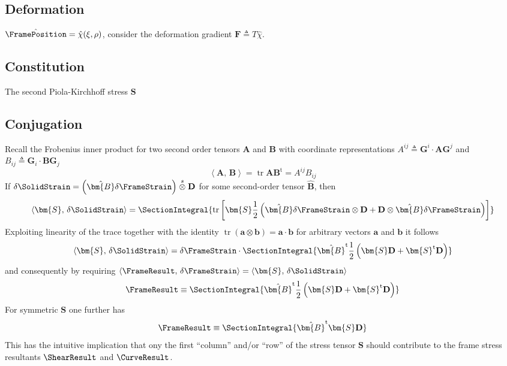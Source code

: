 \subsection{Deformation}

\(\hat{\FramePosition} = \hat{\chi}(\xi,\rho)\), consider the deformation gradient \(\bm{F} \triangleq T\hat{\chi}\).

\subsection{Constitution}
The second Piola-Kirchhoff stress \(\bm{S}\)


\subsection{Conjugation}
Recall the Frobenius inner product for two second order tensors \(\bm{A}\) and \(\bm{B}\) with coordinate representations \(A^{ij} \triangleq \mathbf{G}^i\cdot \bm{A}\mathbf{G}^j\) and  \(B_{ij} \triangleq \mathbf{G}_i\cdot \bm{B}\mathbf{G}_j\)
\begin{equation*}
    \left<\bm{A},\,\bm{B}\right> = \operatorname{tr} \bm{A}\bm{B}^{\mathrm{t}} = A^{ij} B_{ij}
\end{equation*}
If \(\delta \SolidStrain = \left(\hat{\bm{B}} \delta\FrameStrain\right) \stackrel{s}{\otimes}\mathbf{D}\) for some second-order tensor \(\hat{\bm{B}}\), then
\begin{equation*}
    \left<\bm{S},\,\delta\SolidStrain\right> = \SectionIntegral{ 
    \operatorname{tr} \left[\bm{S}\frac{1}{2}\left(\hat{\bm{B}}\delta \FrameStrain\otimes\mathbf{D} + \mathbf{D}\otimes \hat{\bm{B}}\delta \FrameStrain\right)
    \right]
    }
\end{equation*}
Exploiting linearity of the trace together with the identity \(\operatorname{tr} (\bm{a}\otimes\bm{b}) = \bm{a}\cdot \bm{b}\) for arbitrary vectors \(\bm{a}\) and \(\bm{b}\) it follows
\begin{equation*}
    \left<\bm{S},\,\delta\SolidStrain\right> = \delta \FrameStrain\cdot \SectionIntegral{
        \hat{\bm{B}}^{\mathrm{t}}\frac{1}{2}\left(\bm{S}\mathbf{D} + \bm{S}^{\mathrm{t}}\mathbf{D}\right)
    }
\end{equation*}
and consequently by requiring \(\left<\FrameResult,\,\delta\FrameStrain\right>=\left<\bm{S},\,\delta\SolidStrain\right>\)
\begin{equation*}
\FrameResult \equiv \SectionIntegral{\hat{\bm{B}}^{\mathrm{t}}\frac{1}{2}\left(\bm{S}\mathbf{D} + \bm{S}^{\mathrm{t}}\mathbf{D}\right)}
\end{equation*}
For symmetric \(\bm{S}\) one further has
\begin{equation}
\FrameResult \equiv \SectionIntegral{
  \hat{\bm{B}}^{\mathrm{t}} \bm{S}\mathbf{D}
}
\end{equation}
This has the intuitive implication that ony the first ``column'' and/or ``row'' of the stress tensor \(\bm{S}\) should contribute to the frame stress resultants \(\ShearResult\) and \(\CurveResult\).

